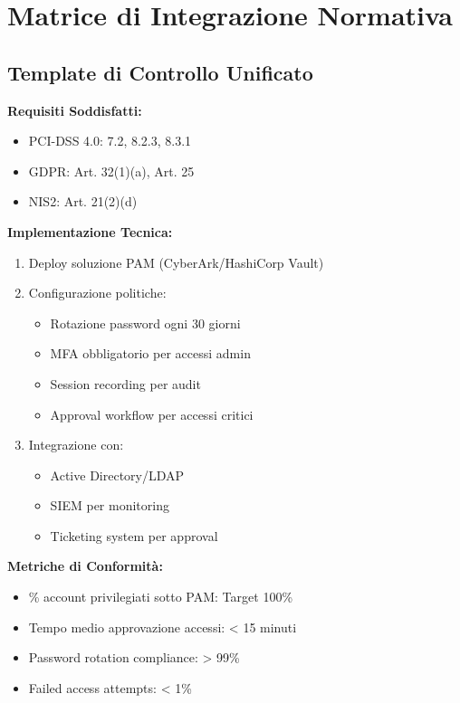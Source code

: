 \section{\texorpdfstring{Matrice di Integrazione Normativa}{D.2 - Matrice di Integrazione Normativa}}

\subsection{\texorpdfstring{Template di Controllo Unificato}{D.2.1 - Template di Controllo Unificato}}

\begin{tcolorbox}[
    colback=blue!5!white,
    colframe=blue!75!black,
    title={\textbf{Controllo Unificato CU-001: Gestione Accessi Privilegiati}},
    fonttitle=\bfseries,
    boxrule=1.5pt,
    arc=2mm,
]
\textbf{Requisiti Soddisfatti:}
\begin{itemize}
    \item PCI-DSS 4.0: 7.2, 8.2.3, 8.3.1
    \item GDPR: Art. 32(1)(a), Art. 25
    \item NIS2: Art. 21(2)(d)
\end{itemize}

\textbf{Implementazione Tecnica:}
\begin{enumerate}
    \item Deploy soluzione PAM (CyberArk/HashiCorp Vault)
    \item Configurazione politiche:
    \begin{itemize}
        \item Rotazione password ogni 30 giorni
        \item MFA obbligatorio per accessi admin
        \item Session recording per audit
        \item Approval workflow per accessi critici
    \end{itemize}
    \item Integrazione con:
    \begin{itemize}
        \item Active Directory/LDAP
        \item SIEM per monitoring
        \item Ticketing system per approval
    \end{itemize}
\end{enumerate}

\textbf{Metriche di Conformità:}
\begin{itemize}
    \item \% account privilegiati sotto PAM: Target 100\%
    \item Tempo medio approvazione accessi: < 15 minuti
    \item Password rotation compliance: > 99\%
    \item Failed access attempts: < 1\%
\end{itemize}


\end{tcolorbox}
